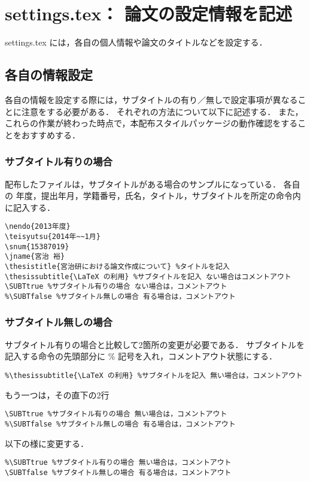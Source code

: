 \section{settings.tex： 論文の設定情報を記述}
settings.tex には，各自の個人情報や論文のタイトルなどを設定する．

\subsection{各自の情報設定}
各自の情報を設定する際には，サブタイトルの有り／無しで設定事項が異なることに注意をする必要がある．
それぞれの方法について以下に記述する．
また，これらの作業が終わった時点で，本配布スタイルパッケージの動作確認をすることをおすすめする．

\subsubsection{サブタイトル有りの場合}
配布したファイルは，サブタイトルがある場合のサンプルになっている．
各自の 年度，提出年月，学籍番号，氏名，タイトル，サブタイトルを所定の命令内に記入する．
\begin{breakbox}
{\small
\begin{verbatim}
\nendo{2013年度}
\teisyutsu{2014年~~1月}
\snum{15387019}
\jname{宮治 裕}
\thesistitle{宮治研における論文作成について} %タイトルを記入
\thesissubtitle{\LaTeX の利用} %サブタイトルを記入 ない場合はコメントアウト
\SUBTtrue %サブタイトル有りの場合 ない場合は，コメントアウト
%\SUBTfalse %サブタイトル無しの場合 有る場合は，コメントアウト
\end{verbatim}
}
\end{breakbox}

\subsubsection{サブタイトル無しの場合}
サブタイトル有りの場合と比較して2箇所の変更が必要である．
サブタイトルを記入する命令の先頭部分に \% 記号を入れ，コメントアウト状態にする．

\begin{breakbox}
{\small
\begin{verbatim}
%\thesissubtitle{\LaTeX の利用} %サブタイトルを記入 無い場合は，コメントアウト
\end{verbatim}
}
\end{breakbox}
もう一つは，その直下の2行
\begin{breakbox}
{\small
\begin{verbatim}
\SUBTtrue %サブタイトル有りの場合 無い場合は，コメントアウト
%\SUBTfalse %サブタイトル無しの場合 有る場合は，コメントアウト
\end{verbatim}
}
\end{breakbox}
以下の様に変更する．
\begin{breakbox}
{\small
\begin{verbatim}
%\SUBTtrue %サブタイトル有りの場合 無い場合は，コメントアウト
\SUBTfalse %サブタイトル無しの場合 有る場合は，コメントアウト
\end{verbatim}
}
\end{breakbox}

